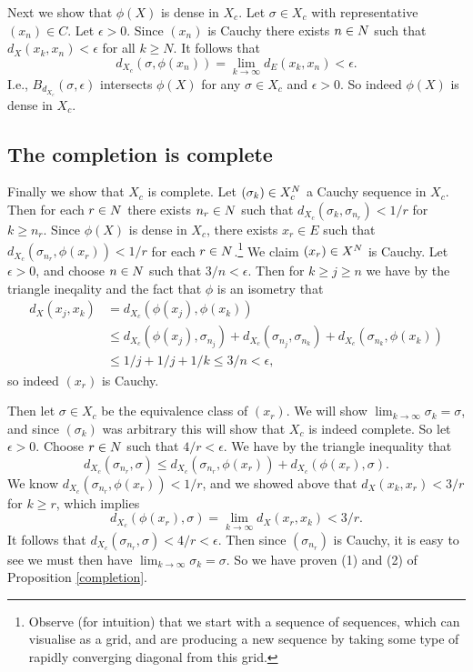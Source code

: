 Next we show that $\phi(X)$ is dense in $X_c$. Let $\sigma \in X_c$
with representative $(x_n) \in C$. Let $\epsilon > 0$. Since $(x_n)$
is Cauchy there exists $n \in N$ such that $d_X(x_k,x_n) < \epsilon$
for all $k \ge N$. It follows that
\[
d_{X_c}(\sigma, \phi(x_n)) = \lim_{k \to \infty} d_E(x_k, x_n) <
\epsilon.
\]
I.e., $B_{d_{X_c}}(\sigma, \epsilon)$ intersects $\phi(X)$ for any
$\sigma \in X_c$ and $\epsilon > 0$. So indeed $\phi(X)$ is dense in
$X_c$.


\subsection{The completion is complete}

Finally we show that $X_c$ is complete. Let $(\sigma_k) \in X_c^{N}$
a Cauchy sequence in $X_c$. Then for each $r \in N$ there exists $n_r
\in N$ such that $d_{X_c} (\sigma_k, \sigma_{n_r}) < 1/r$ for $k \ge
n_r$. Since $\phi(X)$ is dense in $X_c$, there exists $x_r \in E$ such
that $d_{X_c}(\sigma_{n_r}, \phi(x_r)) < 1/r$ for each $r \in
N$.\footnote{Observe (for intuition) that we start with a sequence of
  sequences, which can visualise as a grid, and are producing a new
  sequence by taking some type of rapidly converging diagonal from
  this grid.} We claim $(x_r) \in X^N$ is Cauchy. Let $\epsilon > 0$,
and choose $n \in N$ such that $3/n < \epsilon$. Then for $k \ge j
\ge n$ we have by the triangle ineqality and the fact that $\phi$ is
an isometry that
\begin{align*}
  d_X(x_j,x_k) &= d_{X_c}(\phi(x_j),\phi(x_k)) \\ &\le
  d_{X_c}(\phi(x_j), \sigma_{n_j}) + d_{X_c}(\sigma_{n_j},
  \sigma_{n_k}) + d_{X_c}(\sigma_{n_k}, \phi(x_k)) \\ &\le 1/j + 1/j +
  1/k \le 3/n < \epsilon,
\end{align*}
so indeed $(x_r)$ is Cauchy.

Then let $\sigma \in X_c$ be the equivalence class of $(x_r)$. We will
show $\lim_{k \to \infty} \sigma_k = \sigma$, and since $(\sigma_k)$
was arbitrary this will show that $X_c$ is indeed complete. So let
$\epsilon > 0$. Choose $r \in N$ such that $4/r < \epsilon$. We have
by the triangle inequality that
\[
d_{X_c}(\sigma_{n_r}, \sigma) \le d_{X_c}(\sigma_{n_r}, \phi(x_r)) +
d_{X_c}(\phi(x_r), \sigma).
\]
We know $d_{X_c}(\sigma_{n_r}, \phi(x_r)) < 1/r$, and we showed above
that $d_X(x_k,x_r) < 3/r$ for $k \ge r$, which implies
\[
d_{X_c}(\phi(x_r), \sigma) = \lim_{k \to \infty} d_X(x_r,x_k) < 3/r.
\]
It follows that $d_{X_c}(\sigma_{n_r}, \sigma) < 4/r < \epsilon$. Then
since $(\sigma_{n_r})$ is Cauchy, it is easy to see we must then have
$\lim_{k \to \infty} \sigma_k = \sigma$. So we have proven (1) and (2)
of Proposition \ref{completion}.

